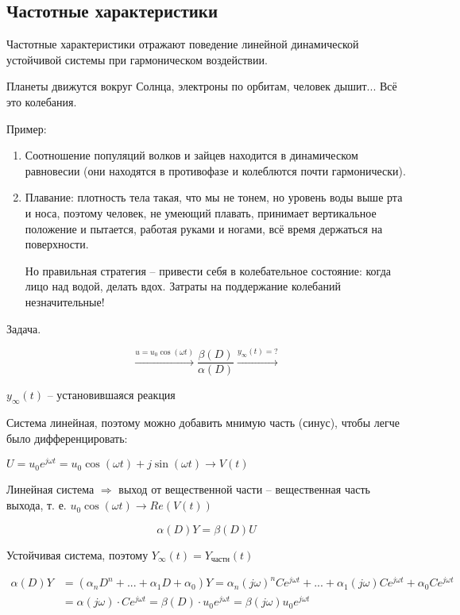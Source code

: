 \documentclass[main.tex]{subfiles}
\begin{document}
\subsection{Частотные характеристики}

Частотные характеристики отражают поведение линейной динамической устойчивой системы при гармоническом воздействии.

Планеты движутся вокруг Солнца, электроны по орбитам, человек дышит...
Всё это колебания.

Пример:
\begin{enumerate}[noitemsep]
	\item Соотношение популяций волков и зайцев находится в динамическом равновесии (они находятся в противофазе и колеблются почти гармонически).
	\item Плавание: плотность тела такая, что мы не тонем, но уровень воды выше рта и носа, поэтому человек, не умеющий плавать, принимает вертикальное положение и пытается, работая руками и ногами, всё время держаться на поверхности.

	Но правильная стратегия -- привести себя в колебательное состояние: когда лицо над водой, делать вдох.
	Затраты на поддержание колебаний незначительные!
\end{enumerate}

Задача.

$$ \xrightarrow{u = u_0 \cos (\omega t)} \boxed{\frac{\beta (D)}{\alpha (D)}} \xrightarrow{y_\infty(t) = ?} $$

$y_\infty(t)$ -- установившаяся реакция

Система линейная, поэтому можно добавить мнимую часть (синус), чтобы легче было дифференцировать:

$ U = u_0 e^{j \omega t} = u_0 \cos (\omega t) + j \sin (\omega t) \to V(t) $

Линейная система $ \Rightarrow $ выход от вещественной части -- вещественная часть выхода, т. е. $ u_0 \cos (\omega t) \to Re(V(t)) $

$$ \alpha(D) Y = \beta(D) U $$

Устойчивая система, поэтому $ Y_\infty(t) = Y_{\text{частн}}(t) $

\begin{align*}
    \alpha(D)Y & = (\alpha_n D^n + ... + \alpha_1 D + \alpha_0) Y = \alpha_n (j \omega)^n Ce^{j \omega t} + ... + \alpha_1 (j\omega) C e^{j \omega t} + \alpha_0 Ce^{j \omega t} \\
    & = \alpha(j \omega) \cdot C e^{j \omega t} = \beta(D) \cdot u_0 e^{j\omega t} = \beta(j\omega) u_0 e^{j\omega t}
\end{align*}
\end{document}
